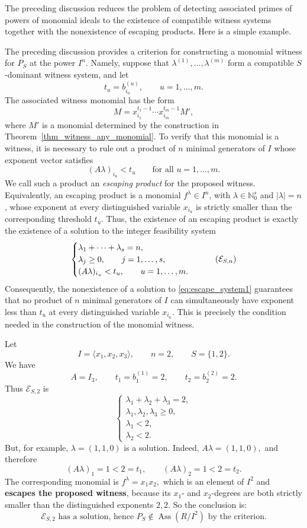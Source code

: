 \documentclass[11pt]{amsart}   %
\begin{document}
The preceding discussion reduces the problem of detecting associated primes
of powers of monomial ideals to the existence of compatible witness systems
together with the nonexistence of escaping products. Here is a simple example.

The preceding discussion provides a criterion for constructing a
monomial witness for $P_S$ at the power $I^n$. Namely, suppose that
$\lambda^{(1)},\ldots,\lambda^{(m)}$ form a compatible $S$-dominant
witness system, and let
\[
t_u=b^{(u)}_{i_u},\qquad u=1,\ldots,m.
\]
The associated witness monomial has the form
\[
M=x_{i_1}^{t_1-1}\cdots x_{i_m}^{t_m-1}M',
\]
where $M'$ is a monomial determined by the construction in
Theorem~\ref{thm_witness_any_monomial}.
To verify that this monomial is a witness, it is necessary to rule out
a product of $n$ minimal generators of $I$ whose exponent vector
satisfies
\[
(A\lambda)_{i_u}<t_u
\qquad\text{for all }u=1,\ldots,m.
\]
We call such a product an \emph{escaping product} for the proposed
witness. Equivalently, an escaping product is a monomial
$f^\lambda\in I^n$, with $\lambda\in\mathbb N_0^s$ and
$|\lambda|=n$, whose exponent at every distinguished variable
$x_{i_u}$ is strictly smaller than the corresponding threshold $t_u$.
Thus, the existence of an escaping product is exactly the existence of
a solution to the integer feasibility system
\[
\begin{cases}
\lambda_1+\cdots+\lambda_s=n,\\
\lambda_j\geq0,\qquad j=1,\ldots,s,\\
(A\lambda)_{i_u}<t_u,\qquad u=1,\ldots,m.
\end{cases}
\tag{$\mathcal E_{S,n}$}
\label{eq:escape_system1}
\]
Consequently, the nonexistence of a solution to
\eqref{eq:escape_system1} guarantees that no product of $n$ minimal
generators of $I$ can simultaneously have exponent less than $t_u$ at
every distinguished variable $x_{i_u}$. This is precisely the
condition needed in the construction of the monomial witness.


\begin{exm}
    Let
\[
I=\langle x_1,x_2,x_3\rangle,\qquad n=2,\qquad S=\{1,2\}.
\]
We have
\[
A=I_3,\qquad
t_1=b^{(1)}_1=2,\qquad t_2=b^{(2)}_2=2.
\]
Thus $\mathcal E_{S,2}$ is
\[
\begin{cases}
\lambda_1+\lambda_2+\lambda_3=2,\\
\lambda_1,\lambda_2,\lambda_3\geq0,\\
\lambda_1<2,\\
\lambda_2<2.
\end{cases}
\]
But, for example, $\lambda=(1,1,0)$
is a solution. Indeed,
$A\lambda=(1,1,0),$
and therefore
\[
(A\lambda)_1=1<2=t_1,\qquad
(A\lambda)_2=1<2=t_2.
\]
The corresponding monomial is
$f^\lambda=x_1x_2,$
which is an element of $I^2$ and \textbf{escapes the proposed witness}, because its $x_1$- and $x_2$-degrees are both strictly smaller than the distinguished exponents $2,2$.
So the conclusion is:
\[
\mathcal E_{S,2}\text{ has a solution, hence }
P_S\notin\operatorname{Ass}(R/I^2)
\text{ by the criterion.}
\]

\end{exm}
\end{document}
